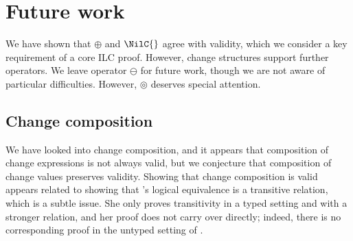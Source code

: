 \section{Future work}
We have shown that \ensuremath{\oplus } and \ensuremath{\NilC{}} agree with validity,
which we consider a key requirement of a core ILC proof. However,
change structures support further operators. We leave operator
\ensuremath{\ominus } for future work, though we are not aware of particular
difficulties.
However, \ensuremath{\circledcirc } deserves special attention.
\subsection{Change composition}
We have looked into change composition, and it appears that
composition of change expressions is not always valid, but we
conjecture that composition of change values preserves validity.
Showing that change composition is valid appears related to
showing that \citeauthor{Ahmed2006stepindexed}'s logical equivalence
is a transitive relation, which is a subtle issue. She only
proves transitivity in a typed setting and with a stronger
relation, and her proof does not carry over directly; indeed,
there is no corresponding proof in the untyped setting of
\citet*{Acar08}.

